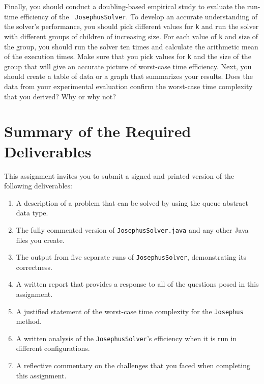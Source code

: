   Finally, you should conduct a doubling-based empirical study to evaluate the run-time efficiency of the {\tt
  JosephusSolver}.  To develop an accurate understanding of the solver's performance, you should pick different values
  for {\tt k} and run the solver with different groups of children of increasing size. For each value of {\tt k} and
  size of the group, you should run the solver ten times and calculate the arithmetic mean of the execution times. Make
  sure that you pick values for {\tt k} and the size of the group that will give an accurate picture of worst-case time
  efficiency. Next, you should create a table of data or a graph that summarizes your results. Does the data from your
  experimental evaluation confirm the worst-case time complexity that you derived? Why or why not?

\section*{Summary of the Required Deliverables}

  This assignment invites you to submit a signed and printed version of the following deliverables:

  \begin{enumerate}

  \item A description of a problem that can be solved by using the queue abstract data type.

  \item The fully commented version of {\tt JosephusSolver.java} and any other Java files you create.

  \item The output from five separate runs of {\tt JosephusSolver}, demonstrating its correctness.

  \item A written report that provides a response to all of the questions posed in this assignment.

  \item A justified statement of the worst-case time complexity for the {\tt Josephus} method.

  \item A written analysis of the {\tt JosephusSolver}'s efficiency when it is run in different configurations.

  \item A reflective commentary on the challenges that you faced when completing this assignment.

  \end{enumerate}

